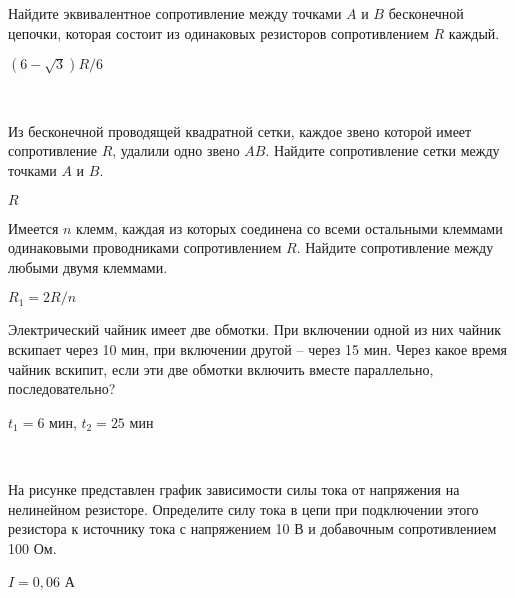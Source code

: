 \begin{ex}
Найдите эквивалентное сопротивление между точками $A$ и $B$ бесконечной цепочки, которая состоит из одинаковых резисторов сопротивлением $R$ каждый.

\centering

\begin{ans}
$(6-\sqrt{3})R/6$
\end{ans}
\end{ex}

\begin{ex}
\hspace{0pt} \\
\begin{minipage}{.65\textwidth}
Из бесконечной проводящей квадратной сетки, каждое звено которой имеет сопротивление $R$, удалили одно звено $AB$. Найдите сопротивление сетки между точками $A$ и $B$.
\end{minipage}
\begin{minipage}{.35\textwidth}
\centering

\end{minipage}
\begin{ans}
$R$
\end{ans}
\end{ex}

\begin{ex}
Имеется $n$ клемм, каждая из которых соединена со всеми остальными клеммами одинаковыми проводниками сопротивлением $R$. Найдите сопротивление между любыми двумя клеммами.
\begin{ans}
$R_1 = 2R/n$
\end{ans}
\end{ex}

\begin{ex}
Электрический чайник имеет две обмотки. При включении одной из них чайник вскипает через 10 мин, при включении другой -- через 15 мин. 
Через какое время чайник вскипит, если эти две обмотки включить вместе параллельно, последовательно?
\begin{ans}
$t_1 = 6$ мин, $t_2 = 25$ мин
\end{ans}
\end{ex}

\begin{ex}
\hspace{0pt} \\
\begin{minipage}{.65\textwidth}
На рисунке представлен график зависимости силы тока от напряжения на нелинейном резисторе. 
Определите силу тока в цепи при подключении этого резистора к источнику тока с напряжением 10 В и добавочным сопротивлением 100 Ом.
\end{minipage}
\begin{minipage}{.35\textwidth}
\centering

\end{minipage}
\begin{ans}
$I = 0,06$ А
\end{ans}
\end{ex}

